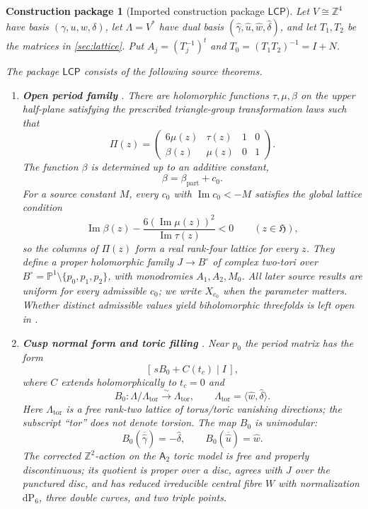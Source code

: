 \documentclass[11pt,reqno]{amsart}
\numberwithin{equation}{section}
\newcommand{\Z}{\mathbb Z}
\newcommand{\Pone}{\mathbb P^1}
\newcommand{\dP}{\mathrm{dP}_6}
\newcommand{\wideg}{\widehat\gamma}
\newcommand{\wideu}{\widehat u}
\newcommand{\widew}{\widehat w}
\newcommand{\wided}{\widehat\delta}
\newcommand{\LambdaTor}{\Lambda_{\mathrm{tor}}}
\newcommand{\LCP}{\mathsf{LCP}}
\newcommand{\Aroot}{\mathsf{A}_2}
\newtheorem{construction}[construction]{Construction package}
\theoremstyle{definition}
\begin{document}
\begin{construction}[Imported construction package $\LCP$]\label{pkg:lcp}
Let $V\cong\Z^4$ have basis $(\gamma,u,w,\delta)$, let $\Lambda=V^*$ have dual basis $(\wideg,\wideu,\widew,\wided)$, and let $T_1,T_2$ be the matrices in \cref{sec:lattice}. Put $A_j=(T_j^{-1})^t$ and $T_0=(T_1T_2)^{-1}=I+N$.

The package $\LCP$ consists of the following source theorems.
\begin{enumerate}[label=\textup{(L\arabic*)}]
\item \textbf{Open period family} \cite[Thm.~3.4]{S6}. There are holomorphic functions $\tau,\mu,\beta$ on the upper half-plane satisfying the prescribed triangle-group transformation laws such that
\[
 \Pi(z)=
 \begin{pmatrix}
 6\mu(z)&\tau(z)&1&0\\
 \beta(z)&\mu(z)&0&1
 \end{pmatrix}.
\]
The function $\beta$ is determined up to an additive constant,
\[
\beta=\beta_{\mathrm{part}}+c_0.
\]
For a source constant $M$, every $c_0$ with $\operatorname{Im}c_0<-M$ satisfies the global lattice condition
\begin{equation}\tag{$\beta3$}\label{eq:beta3}
\operatorname{Im}\beta(z)
-\frac{6(\operatorname{Im}\mu(z))^2}{\operatorname{Im}\tau(z)}<0
\qquad(z\in\mathfrak H),
\end{equation}
so the columns of $\Pi(z)$ form a real rank-four lattice for every $z$. They define a proper holomorphic family $J\to B^\circ$ of complex two-tori over $B^\circ=\Pone\setminus\{p_0,p_1,p_2\}$, with monodromies $A_1,A_2,M_0$. All later source results are uniform for every admissible $c_0$; we write $X_{c_0}$ when the parameter matters. Whether distinct admissible values yield biholomorphic threefolds is left open in \cite[Rem.~6.4]{S6}.

\item \textbf{Cusp normal form and toric filling} \cite[Prop.~3.21, Thm.~4.5, Props.~4.6--4.7]{S6}. Near $p_0$ the period matrix has the form
\[
 [\,sB_0+C(t_c)\mid I\,],
\]
where $C$ extends holomorphically to $t_c=0$ and
\[
 B_0:\Lambda/\LambdaTor\xrightarrow{\sim}\LambdaTor,
 \qquad
 \LambdaTor=\langle\widew,\wided\rangle.
\]
Here $\LambdaTor$ is a free rank-two lattice of torus/toric vanishing directions; the subscript ``tor'' does not denote torsion. The map $B_0$ is unimodular:
\[
 B_0(\overline{\wideg})=-\wided,
 \qquad
 B_0(\overline{\wideu})=\widew.
\]
The corrected $\Z^2$-action on the $\Aroot$ toric model is free and properly discontinuous; its quotient is proper over a disc, agrees with $J$ over the punctured disc, and has reduced irreducible central fibre $W$ with normalization $\dP$, three double curves, and two triple points.


\end{enumerate}
\end{construction}
\end{document}
